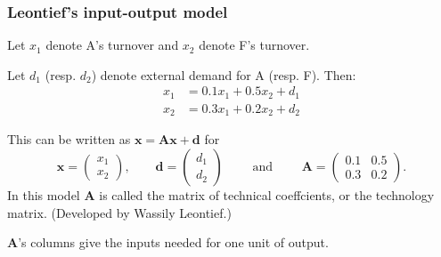 \documentclass[dvips, %
               xcolor=pst,
               hyperref={colorlinks=false,
               dvips,
               citecolor=magenta,menucolor=cyan,
               bookmarks,bookmarksopen,pdfpagemode=UseThumbs}
              ]{beamer}
\renewcommand{\red}{}
\renewcommand{\blue}{}}{\newcommand{\emphy}{}}
\begin{document}
\begin{frame}[fragile]\frametitle{Leontief's input-output model}

Let $x_1$ denote A's turnover and $x_2$ denote F's turnover.

\medskip
Let $d_1$ (resp. $d_2$) denote external demand for A (resp. F).
Then:
\begin{align*}
x_1 & = 0.1 x_1 + 0.5 x_2 + d_1
\\
x_2 & = 0.3 x_1 + 0.2 x_2 + d_2
\end{align*}

\pause
This can be written as
$\boldsymbol{x} = \boldsymbol{A}\boldsymbol{x}+\boldsymbol{d}$
for
\[
\boldsymbol{x} = \left(\begin{array}{r}
x_1 \\ x_2
\end{array}\right),
\qquad
\boldsymbol{d} = \left(\begin{array}{r}
d_1 \\ d_2
\end{array}\right)
\qquad\text{ and }\qquad
\boldsymbol{A} = \left(\begin{array}{rr}
0.1 & 0.5 \\ 0.3 & 0.2
\end{array}\right).
\]
\pause
In this model $\boldsymbol{A}$ is called the {\red matrix of technical coeffcients}, or 
the {\blue technology matrix}. (Developed by Wassily Leontief.)

\pause\medskip
$\boldsymbol{A}$'s columns give the inputs needed for one unit of output.

\end{frame}
\end{document}
